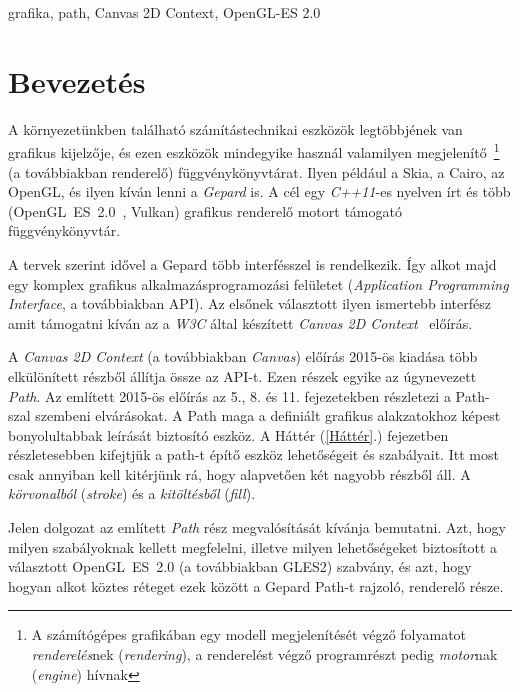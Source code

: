 \documentclass[12pt]{report}
\theoremstyle{definition}
\newcommand{\inenglish}[1]{\textsl{#1}}
\newcommand{\inenglishfn}[1]{\footnotesize{\inenglish{#1}}}
\begin{document}
grafika, path, Canvas 2D Context, OpenGL-ES 2.0



    \chapter*{Bevezetés}
    \label{Bevezetés}

A környezetünkben található számítástechnikai eszközök legtöbbjének van
grafikus kijelzője, és ezen eszközök mindegyike használ valamilyen
megjelenítő~\footnote{A számítógépes grafikában egy modell megjelenítését végző
folyamatot \emph{renderelés}nek (\inenglishfn{rendering}), a renderelést végző
programrészt pedig \emph{motor}nak (\inenglishfn{engine}) hívnak} (a
továbbiakban renderelő) függvénykönyvtárat. Ilyen például a Skia, a Cairo, az
OpenGL, és ilyen kíván lenni a \emph{Gepard} is. A cél egy \emph{C++11}-es
nyelven írt és több (\mbox{OpenGL~ES~2.0 \cite{Munshi:2008:OEP:1481069}},
Vulkan) grafikus renderelő motort támogató függvénykönyvtár.

A tervek szerint idővel a Gepard több interfésszel is rendelkezik. Így alkot
majd egy komplex grafikus alkalmazásprogramozási felületet
(\inenglish{Application Programming Interface}, a továbbiakban API). Az elsőnek
választott ilyen ismertebb interfész amit támogatni kíván az a \emph{W3C} által
készített \emph{Canvas 2D Context}~\cite{Cabanier:14:HCC} előírás.

A \emph{Canvas 2D Context} (a továbbiakban \emph{Canvas}) előírás 2015-ös
kiadása több elkülönített részből állítja össze az API-t. Ezen részek egyike az
úgynevezett \emph{Path}. Az említett 2015-ös előírás az 5., 8. és 11.
fejezetekben részletezi a Path-szal szembeni elvárásokat. A Path maga a
definiált grafikus alakzatokhoz képest bonyolultabbak leírását biztosító
eszköz. A Háttér (\ref{Háttér}.) fejezetben részletesebben kifejtjük a path-t
építő eszköz lehetőségeit és szabályait. Itt most csak annyiban kell kitérjünk
rá, hogy alapvetően két nagyobb részből áll. A \emph{körvonalból}
(\inenglish{stroke}) és a \emph{kitöltésből} (\inenglish{fill}).

Jelen dolgozat az említett \emph{Path} rész megvalósítását kívánja bemutatni.
Azt, hogy milyen szabályoknak kellett megfelelni, illetve milyen lehetőségeket
biztosított a választott OpenGL~ES~2.0 (a továbbiakban GLES2) szabvány, és azt,
hogy hogyan alkot köztes réteget ezek között a Gepard Path-t rajzoló, renderelő
része.
\end{document}

